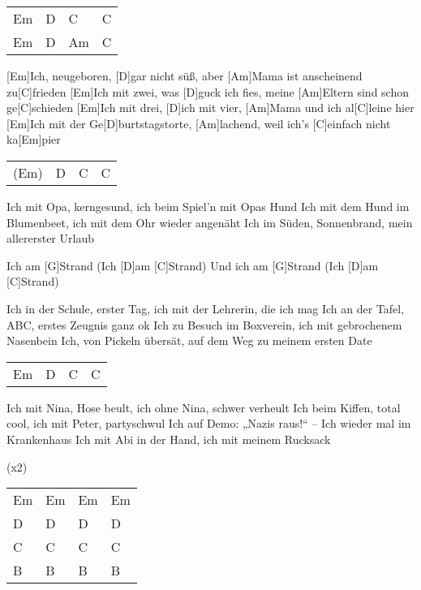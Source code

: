 

\begin{guitar}
	{\footnotesize\begin{tabular}{l|l|l|l}
			Em & D & C & C \\
			Em & D & Am & C
	\end{tabular}}

	[Em]Ich, neugeboren, [D]gar nicht süß, aber [Am]Mama ist anscheinend zu[C]frieden
	[Em]Ich mit zwei, was [D]guck ich fies, meine [Am]Eltern sind schon ge[C]schieden
	[Em]Ich mit drei, [D]ich mit vier, [Am]Mama und ich al[C]leine hier
	[Em]Ich mit der Ge[D]burtstagstorte, [Am]lachend, weil ich's [C]einfach nicht ka[Em]pier
	
	{\footnotesize\begin{tabular}{l|l|l|l}
			(Em) & D & C & C
	\end{tabular}}
	
	Ich mit Opa, kerngesund, ich beim Spiel'n mit Opas Hund
	Ich mit dem Hund im Blumenbeet, ich mit dem Ohr wieder angenäht
	Ich im Süden, Sonnenbrand, mein allererster Urlaub
	
	Ich am [G]Strand (Ich [D]am [C]Strand)
	Und ich am [G]Strand (Ich [D]am [C]Strand)
	
	Ich in der Schule, erster Tag, ich mit der Lehrerin, die ich mag
	Ich an der Tafel, ABC, erstes Zeugnis ganz ok
	Ich zu Besuch im Boxverein, ich mit gebrochenem Nasenbein
	Ich, von Pickeln übersät, auf dem Weg zu meinem ersten Date
	
	{\footnotesize\begin{tabular}{l|l|l|l}
			Em & D & C & C
	\end{tabular}}

	Ich mit Nina, Hose beult, ich ohne Nina, schwer verheult
	Ich beim Kiffen, total cool, ich mit Peter, partyschwul
	Ich auf Demo: „Nazis raus!“ – Ich wieder mal im Krankenhaus
	Ich mit Abi in der Hand, ich mit meinem Rucksack
	
	  (x2)
	
	{\footnotesize\begin{tabular}{l|l|l|l}
			Em & Em & Em & Em \\
			D & D & D & D \\
			C & C & C & C \\
			B & B & B & B
	\end{tabular}}
	

\end{guitar}
